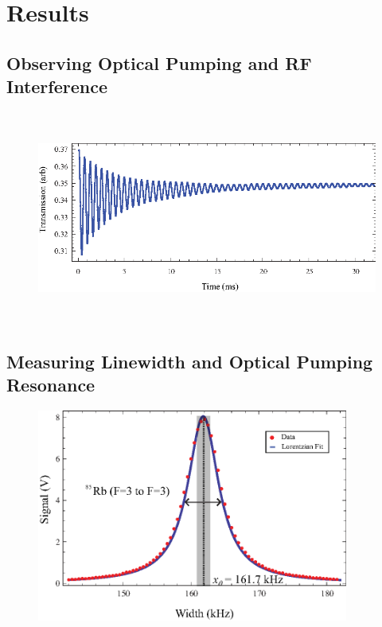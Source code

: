 
\section{Results}\label{results}

\subsection{Observing Optical Pumping and RF Interference}

\begin{figure}[htbp]
\begin{center}
\includegraphics[height=70mm]{./figures/rabi.eps}
\caption{\small{}}
\label{fig:rabi}
\end{center}
\end{figure}

\subsection{Measuring Linewidth and Optical Pumping Resonance}

\begin{figure}[htbp]
\begin{center}
\includegraphics[height=70mm]{./figures/85raw_width.eps}
\caption{\small{}}
\label{fig:85raw}
\end{center}
\end{figure}

